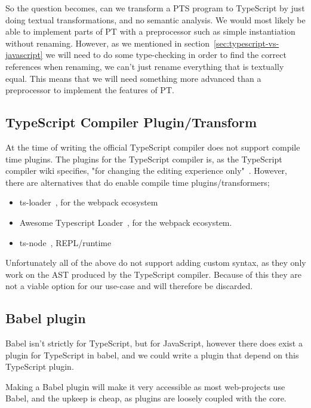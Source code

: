 So the question becomes, can we transform a PTS program to TypeScript by just doing textual transformations, and no semantic analysis.
We would most likely be able to implement parts of PT with a preprocessor such as simple instantiation without renaming.
However, as we mentioned in section~\vref{sec:typescript-vs-javascript} we will need to do some type-checking in order to find the correct references when renaming, we can't just rename everything that is textually equal.
This means that we will need something more advanced than a preprocessor to implement the features of PT\@.

\subsection{TypeScript Compiler Plugin/Transform}\label{subsec:typescript-compiler-plugin}

At the time of writing the official TypeScript compiler does not support compile time plugins.
The plugins for the TypeScript compiler is, as the TypeScript compiler wiki specifies, "for changing the editing experience only"~\cite{tscplugin}.
However, there are alternatives that do enable compile time plugins/transformers;

\begin{itemize}
    \item ts-loader~\cite{tsloadergithub}, for the webpack ecosystem
    \item Awesome Typescript Loader~\cite{awesometypescriptloadergithub}, for the webpack ecosystem.
    \item ts-node~\cite{tsnodegithub}, REPL/runtime
\end{itemize}

Unfortunately all of the above do not support adding custom syntax, as they only work on the AST produced by the TypeScript compiler.
Because of this they are not a viable option for our use-case and will therefore be discarded.

\subsection{Babel plugin}\label{subsec:babel-plugin}

Babel isn't strictly for TypeScript, but for JavaScript, however there does exist a plugin for TypeScript in babel, and we could write a plugin that depend on this TypeScript plugin.

Making a Babel plugin will make it very accessible as most web-projects use Babel, and the upkeep is cheap, as plugins are loosely coupled with the core.

